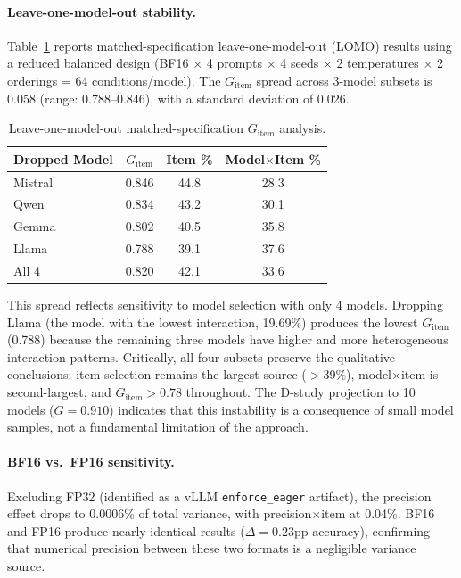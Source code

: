 \documentclass[letterpaper]{article}
\begin{document}
\paragraph{Leave-one-model-out stability.}
Table~\ref{tab:lomo} reports matched-specification leave-one-model-out (LOMO) results using a reduced balanced design (BF16 $\times$ 4 prompts $\times$ 4 seeds $\times$ 2 temperatures $\times$ 2 orderings = 64 conditions/model).
The $G_{\text{item}}$ spread across 3-model subsets is 0.058 (range: 0.788--0.846), with a standard deviation of 0.026.

\begin{table}[t]
\centering
\caption{Leave-one-model-out matched-specification $G_{\text{item}}$ analysis.}
\label{tab:lomo}
\begin{tabular}{lccc}
\toprule
Dropped Model & $G_{\text{item}}$ & Item \% & Model$\times$Item \% \\
\midrule
Mistral & 0.846 & 44.8 & 28.3 \\
Qwen    & 0.834 & 43.2 & 30.1 \\
Gemma   & 0.802 & 40.5 & 35.8 \\
Llama   & 0.788 & 39.1 & 37.6 \\
\midrule
All 4   & 0.820 & 42.1 & 33.6 \\
\bottomrule
\end{tabular}
\end{table}

This spread reflects sensitivity to model selection with only 4 models.
Dropping Llama (the model with the lowest interaction, 19.69\%) produces the lowest $G_{\text{item}}$ (0.788) because the remaining three models have higher and more heterogeneous interaction patterns.
Critically, all four subsets preserve the qualitative conclusions: item selection remains the largest source ($>$39\%), model$\times$item is second-largest, and $G_{\text{item}} > 0.78$ throughout.
The D-study projection to 10 models ($G = 0.910$) indicates that this instability is a consequence of small model samples, not a fundamental limitation of the approach.

\paragraph{BF16 vs.\ FP16 sensitivity.}
Excluding FP32 (identified as a vLLM \texttt{enforce\_eager} artifact), the precision effect drops to 0.0006\% of total variance, with precision$\times$item at 0.04\%.
BF16 and FP16 produce nearly identical results ($\Delta = 0.23$pp accuracy), confirming that numerical precision between these two formats is a negligible variance source.
\end{document}
